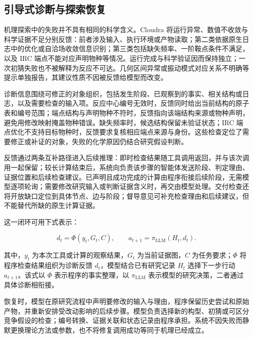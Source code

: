 \subsection{引导式诊断与探索恢复}

机理探索中的失败并不具有相同的科学含义。Cloudra 将运行异常、数值不收敛与科学证据不足分别反馈：前者涉及输入、执行环境或产物读取；第二类依据原生日志中的优化或自洽场收敛信息识别；第三类包括缺失频率、一阶鞍点条件不满足，以及 IRC 端点不能对应声明物种等情况。运行完成与科学验证因而保持独立；一次初猜失败也不被解释为反应不可达。几何区间异常或振动模式对应关系不明确等提示单独报告，其建议性质不因被反馈给模型而改变。

诊断信息围绕可修正的对象组织，包括发生阶段、已观察到的事实、相关结构或日志，以及需要检查的输入项。反应中心编号无效时，反馈同时给出当前结构的原子表和编号范围；端点结构与声明物种不符时，反馈指向该端结构来源或物种声明，避免用修改映射掩盖物种错误。缺失频率时，候选结构保留未验证状态；IRC 端点优化不支持目标物种时，反馈要求复核相应端点来源与身份。这些检查定位了需要修正或补证的对象，失败的化学原因仍结合研究假设判断。

反馈通过两条互补路径进入后续推理：即时检查结果随工具调用返回，并与该次调用一起保留；较长计算结束后，系统向负责该步骤的智能体发送阶段、判定理由、证据位置和后续检查建议。已声明且成功完成的计算由程序衔接后续阶段，无需模型逐项轮询；需要修改研究输入或判断证据含义时，再交由模型处理。交付检查还将开放缺口定位到具体节点、边与阶段；督导意见可补充检查理由和后续建议，但不能替代所缺的原生计算证据。

这一闭环可用下式表示：

\begin{equation}\label{eq:methods-15}
d_t=\Phi(y_t,G_t,C),\qquad
a_{t+1}=\pi_{\mathrm{LLM}}(H_t,d_t).
\end{equation}

其中，$y_t$ 为本次工具或计算的观察结果，$G_t$ 为当前证据图，$C$ 为任务要求；$\Phi$ 将程序检查结果组织为诊断反馈 $d_t$，模型结合已有研究记录 $H_t$ 选择下一步行动 $a_{t+1}$。该式以 $\Phi$ 表示程序的事实整理，以 $\pi_{\mathrm{LLM}}$ 表示模型的研究决策，二者通过具体诊断相衔接。

恢复时，模型在原研究流程中声明要修改的输入与理由，程序保留历史尝试和原始产物，并重新安排受改动影响的后续步骤。模型负责选择新的构型、初猜或可区分竞争假设的检查；编号转换、证据关联和状态记录由程序承担。系统不因失败而静默更换理论方法或参数，也不将修复调用成功等同于机理已经成立。

